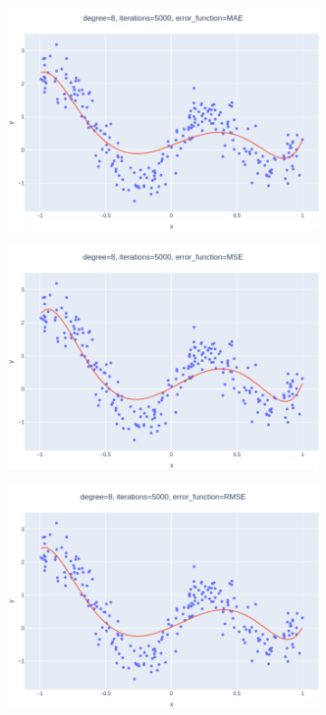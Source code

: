 \documentclass[14pt,a4]{article}
\begin{document}
\begin{figure}[h]
\begin{subfigure}{0.3\linewidth}
        \includegraphics[width=\textwidth]{images/implementation/q1/part_c/8_5000_MAE.png}
    \end{subfigure}
    \hfill
    \begin{subfigure}{0.3\textwidth}
        \centering
        \includegraphics[width=\textwidth]{images/implementation/q1/part_c/8_5000_MSE.png}
    \end{subfigure}
    \hfill
    \begin{subfigure}{0.3\linewidth}
        \centering
        \includegraphics[width=\textwidth]{images/implementation/q1/part_c/8_5000_RMSE.png}

\end{subfigure}
\end{figure}
\end{document}

